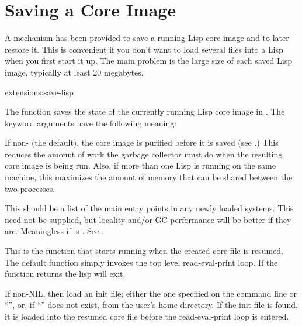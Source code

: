 \section{Saving a Core Image}

A mechanism has been provided to save a running Lisp core image and to
later restore it.  This is convenient if you don't want to load several files
into a Lisp when you first start it up.  The main problem is the large
size of each saved Lisp image, typically at least 20 megabytes.

\begin{defun}{extensions:}{save-lisp}{%
    }
  
  The  function saves the state of the currently
  running Lisp core image in .  The keyword arguments have
  the following meaning:
  \begin{Lentry}
    
  \item[\kwd{purify}] If non-\nil{} (the default), the core image is
    purified before it is saved (see .)  This reduces
    the amount of work the garbage collector must do when the
    resulting core image is being run.  Also, if more than one Lisp is
    running on the same machine, this maximizes the amount of memory
    that can be shared between the two processes.
    
  \item[\kwd{root-structures}]
      This should be a list of the main entry points in any newly
      loaded systems.  This need not be supplied, but locality and/or
      GC performance will be better if they are.  Meaningless if
       is \nil.  See .

  \item[\kwd{init-function}] This is the function that starts running
    when the created core file is resumed.  The default function
    simply invokes the top level read-eval-print loop.  If the
    function returns the lisp will exit.
    
  \item[\kwd{load-init-file}] If non-NIL, then load an init file;
    either the one specified on the command line or
    ``'', or, if
    ``'' does not exist,
     from the user's home directory.  If the init file
    is found, it is loaded into the resumed core file before the
    read-eval-print loop is entered.
    

\end{Lentry}
\end{defun}
